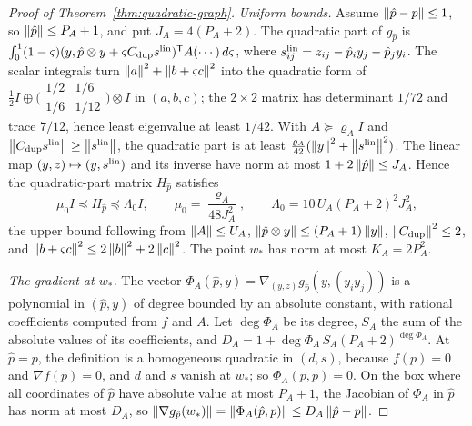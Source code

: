 \begin{proof}[Proof of Theorem~\ref{thm:quadratic-graph}]
\emph{Uniform bounds.} Assume $\left\lVert\hat p-p\right\rVert\le1$, so
$\left\lVert\hat p\right\rVert\le P_A+1$, and put $J_A=4(P_A+2)$. The quadratic part of
$g_{\hat p}$ is
$\int_0^1(1-\varsigma)(y,\hat p\otimes y+\varsigma C_{\mathrm{dup}}s^{\rm
lin})^{\mathsf T}A(\cdots)\,d\varsigma$, where
$s^{\rm lin}_{ij}=z_{ij}-\hat p_iy_j-\hat p_jy_i$. The scalar integrals turn
$\left\lVert a\right\rVert^2+\left\lVert b+\varsigma c\right\rVert^2$ into the quadratic form of
$\tfrac12I\oplus\bigl(\begin{smallmatrix}1/2&1/6\\1/6&1/12\end{smallmatrix}
\bigr)\otimes I$ in $(a,b,c)$; the $2\times2$ matrix has determinant $1/72$
and trace $7/12$, hence least eigenvalue at least $1/42$. With $A\succeq
\varrho_AI$ and $\left\lVert C_{\mathrm{dup}}s^{\rm lin}\right\rVert\ge\left\lVert s^{\rm lin}\right\rVert$, the
quadratic part is at least $\frac{\varrho_A}{42}(\left\lVert y\right\rVert^2+\left\lVert s^{\rm lin}\right\rVert^2)$.
The linear map $(y,z)\mapsto(y,s^{\rm lin})$ and its inverse have norm at most
$1+2\left\lVert\hat p\right\rVert\le J_A$. Hence the quadratic-part matrix $H_{\hat p}$ satisfies
\[
 \mu_0I\preceq H_{\hat p}\preceq\Lambda_0I,\qquad
 \mu_0=\frac{\varrho_A}{48J_A^2},\qquad \Lambda_0=10\,U_A(P_A+2)^2J_A^2,
\]
the upper bound following from $\left\lVert A\right\rVert\le U_A$,
$\left\lVert\hat p\otimes y\right\rVert\le(P_A+1)\left\lVert y\right\rVert$, $\left\lVert C_{\mathrm{dup}}\right\rVert^2\le2$, and
$\left\lVert b+\varsigma c\right\rVert^2\le2\left\lVert b\right\rVert^2+2\left\lVert c\right\rVert^2$. The point $w_*$ has norm at
most $K_A=2P_A^2$.

\emph{The gradient at $w_*$.} The vector
$\Phi_A(\hat p,y)=\nabla_{(y,z)}g_{\hat p}(y,(y_iy_j))$ is a polynomial in
$(\hat p,y)$ of degree bounded by an absolute constant, with rational
coefficients computed from $f$ and $A$. Let $\deg\Phi_A$ be its degree, $S_A$
the sum of the absolute values of its coefficients, and
$D_A=1+\deg\Phi_A\,S_A(P_A+2)^{\deg\Phi_A}$. At $\hat p=p$, the definition is a
homogeneous quadratic in $(d,s)$, because $f(p)=0$ and $\nabla f(p)=0$, and
$d$ and $s$ vanish at $w_*$; so $\Phi_A(p,p)=0$. On the box where all
coordinates of $\hat p$ have absolute value at most $P_A+1$, the Jacobian of
$\Phi_A$ in $\hat p$ has norm at most $D_A$, so
$\left\lVert\nabla g_{\hat p}(w_*)\right\rVert=\left\lVert\Phi_A(\hat p,p)\right\rVert\le D_A\left\lVert\hat p-p\right\rVert$.


\end{proof}
